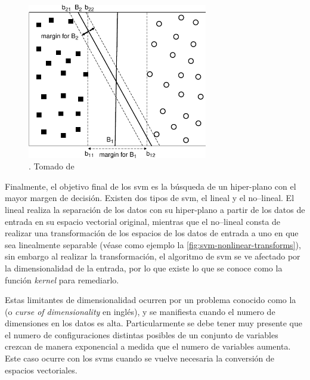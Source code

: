 \begin{figure}[H]
   \centering
   \includegraphics[width=0.7\textwidth]{Figures/svm-hyperplanes.pdf}
   \decoRule
   \caption[]{. Tomado de \cite{tan2005introduction}}
   \label{fig:svm-hyperplanes}
\end{figure}

Finalmente, el objetivo final de los \gls{svm} es la búsqueda de un hiper-plano con el mayor margen de decisión. Existen dos tipos de \gls{svm}, el lineal y el no--lineal. El lineal realiza la separación de los datos con su hiper-plano a partir de los datos de entrada en su espacio vectorial original, mientras que el no--lineal consta de realizar una transformación de los espacios de los datos de entrada a uno en que sea linealmente separable (véase como ejemplo la \cref{fig:svm-nonlinear-transforms}), sin embargo al realizar la transformación, el algoritmo de \gls{svm} se ve afectado por la dimensionalidad de la entrada, por lo que existe lo que se conoce como la función \emph{kernel} para remediarlo.

Estas limitantes de dimensionalidad ocurren por un problema conocido como la  (o \textsl{curse of dimensionality} en inglés), y se manifiesta cuando el numero de dimensiones en los datos es alta. Particularmente se debe tener muy presente que el numero de configuraciones distintas posibles de un conjunto de variables crezcan de manera exponencial a medida que el numero de variables aumenta. Este caso ocurre con los \glspl{svm} cuando se vuelve necesaria la conversión de espacios vectoriales.

